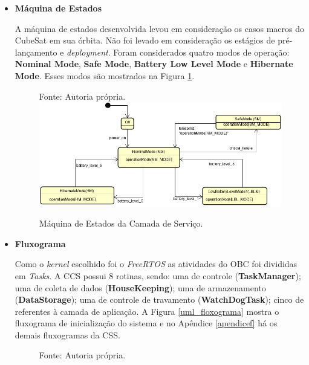 \begin{itemize}
	
	\item \textbf{Máquina de Estados}
	
	A máquina de estados desenvolvida levou em consideração os casos macros do CubeSat em sua órbita. Não foi levado em consideração os estágios de pré-lançamento e \textit{deployment}. Foram considerados quatro modos de operação: \textbf{Nominal Mode}, \textbf{Safe Mode}, \textbf{Battery Low Level Mode} e \textbf{Hibernate Mode}. Esses modos são mostrados na Figura \ref{uml_me}.
	
	\begin{figure}[h]
		\centering
\footnotesize{			
			\centering
		\footnotesize{Fonte: Autoria própria.}
		\includegraphics[keepaspectratio=true,scale=0.62]{figuras/stateMachine.png}
		\caption{Máquina de Estados da Camada de Serviço.}
		\label{uml_me}
	}
	\end{figure}
	\FloatBarrier
	
	\item \textbf{Fluxograma}
	
	Como o \textit{kernel} escolhido foi o \textit{FreeRTOS} as atividades do OBC foi divididas em \textit{Tasks}. A CCS possui 8 rotinas, sendo: uma de controle (\textbf{TaskManager}); uma de coleta de dados (\textbf{HouseKeeping}); uma de armazenamento (\textbf{DataStorage}); uma de controle de travamento (\textbf{WatchDogTask}); cinco de referentes à camada de aplicação. A Figura \ref{uml_floxograma} mostra o fluxograma de inicialização do sistema e no Apêndice \ref{apendicef} há os demais fluxogramas da CSS. 
	
	\begin{figure}[h]
	\footnotesize{	
		\centering
		
			\centering
		\footnotesize{Fonte: Autoria própria.}
		
}
\end{figure}
\end{itemize}
